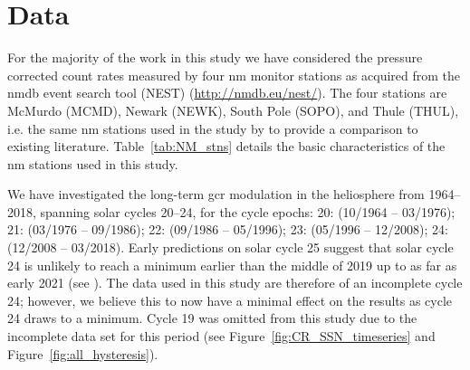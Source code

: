 \section{Data}
\label{S-Data} 

For the majority of the work in this study we have considered the pressure corrected count rates measured by four \gls{nm} monitor stations as acquired from the \gls{nmdb} \citep{nmdb_nmdb_nodate} event search tool (NEST) (\url{http://nmdb.eu/nest/}). The four stations are McMurdo (MCMD), Newark (NEWK), South Pole (SOPO), and Thule (THUL), i.e. the same \gls{nm} stations used in the study by \citet{inceoglu_modeling_2014} to provide a comparison to existing literature. Table~\ref{tab:NM_stns} details the basic characteristics of the \gls{nm} stations used in this study. 

We have investigated the long-term \gls{gcr} modulation in the heliosphere from 1964--2018, spanning solar cycles 20--24, for the cycle epochs: 20: (10/1964 -- 03/1976); 21: (03/1976 -- 09/1986); 22: (09/1986 -- 05/1996); 23: (05/1996 -- 12/2008); 24: (12/2008 -- 03/2018). Early predictions on solar cycle 25 suggest that solar cycle 24 is unlikely to reach a minimum earlier than the middle of 2019 up to as far as early 2021 (see \cite{howe_signatures_2018, upton_updated_2018, pesnell_early_2018}). The data used in this study are therefore of an incomplete cycle 24; however, we believe this to now have a minimal effect on the results as cycle 24 draws to a minimum. Cycle 19 was omitted from this study due to the incomplete data set for this period (see Figure~\ref{fig:CR_SSN_timeseries} and Figure~\ref{fig:all_hysteresis}). 

\vspace{1em}

